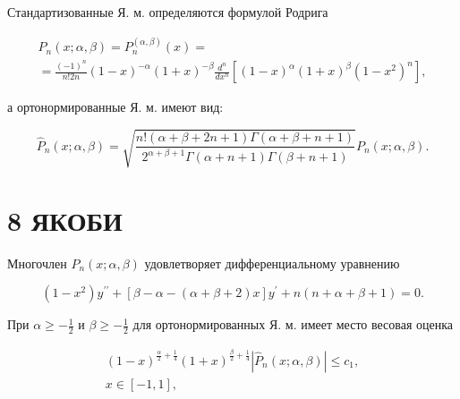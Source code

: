 \documentclass[10pt]{article}
\begin{document}
Стандартизованные Я. м. определяются формулой Родрига



\[

\begin{gathered}

P_{n}(x ; \alpha, \beta)=P_{n}^{(\alpha, \beta)}(x)= \\

=\frac{(-1)^{n}}{n ! 2 n}(1-x)^{-\alpha}(1+x)^{-\beta} \frac{d^{n}}{d x^{n}}\left[(1-x)^{\alpha}(1+x)^{\beta}\left(1-x^{2}\right)^{n}\right],

\end{gathered}

\]



а ортонормированные Я. м. имеют вид:



\[

\hat{P}_{n}(x ; \alpha, \beta)=\sqrt{\frac{n !(\alpha+\beta+2 n+1) \Gamma(\alpha+\beta+n+1)}{2^{\alpha+\beta+1} \Gamma(\alpha+n+1) \Gamma(\beta+n+1)}} P_{n}(x ; \alpha, \beta) .

\]



\section{8 ЯКОБИ}

Многочлен $P_{n}(x ; \alpha, \beta)$ удовлетворяет дифференциальному уравнению



\[

\left(1-x^{2}\right) y^{\prime \prime}+[\beta-\alpha-(\alpha+\beta+2) x] y^{\prime}+n(n+\alpha+\beta+1)=0 .

\]



При $\alpha \geqslant-\frac{1}{2}$ и $\beta \geqslant-\frac{1}{2}$ для ортонормированных Я. м. имеет место весовая оценка



\[

\begin{gathered}

(1-x)^{\frac{\alpha}{2}+\frac{1}{4}}(1+x)^{\frac{\beta}{2}+\frac{1}{4}}\left|\hat{P}_{n}(x ; \alpha, \beta)\right| \leqslant c_{1}, \\

x \in[-1,1],

\end{gathered}

\]
\end{document}
